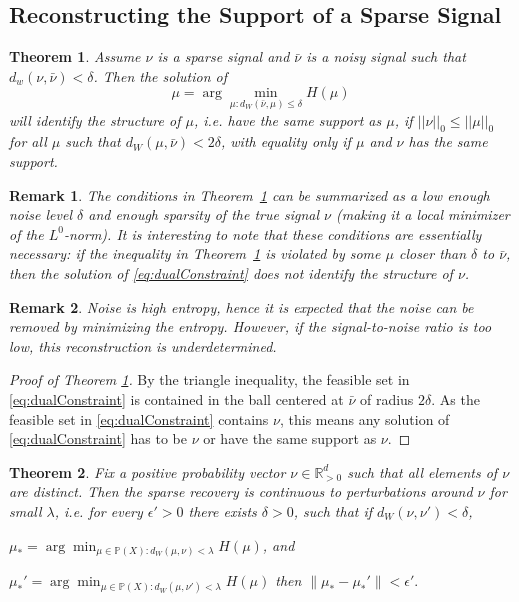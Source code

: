 \documentclass[conference]{IEEEtran}
\newcommand{\R}{{\mathbb{R}}}
\newcommand{\bbP}{{\mathbb{P}}}
\newtheorem{theorem}{Theorem}
\newtheorem*{remark}{Remark}
\begin{document}
\subsection{Reconstructing the Support of a Sparse Signal}
\begin{theorem}
    \label{thm1}
    Assume $\nu$ is a sparse signal and $\bar\nu$ is a noisy signal such that 
    $d_w(\nu,\bar\nu) < \delta $. Then the solution of 
    \begin{equation} \label{eq:dualConstraint} \mu=\arg\min_{\mu : d_W(\bar\nu,\mu) \le \delta} H(\mu) \end{equation} 
    will identify the structure of $\mu$, i.e. have the same support as $\mu$, if $||\nu||_0 \leq ||\mu||_0$ for all $\mu$ such that $d_W(\mu,\bar\nu)<2\delta$, with equality only if $\mu$ and $\nu$ has the same support.  
\end{theorem}

\begin{remark}
    The conditions in Theorem~\ref{thm1} can be summarized as a low enough noise level $\delta$ and enough sparsity of the true signal $\nu$ (making it a local minimizer of the $L^0$-norm). It is interesting to note that these conditions are essentially necessary: if the inequality in Theorem~\ref{thm1} is violated by some $\mu$ closer than $\delta$ to $\bar\nu$, then the solution of \eqref{eq:dualConstraint} does not identify the structure of $\nu$. 
\end{remark}

\begin{remark}
    Noise is high entropy, hence it is expected that the noise can be removed by minimizing the entropy. However, if the signal-to-noise ratio is too low, this reconstruction is underdetermined.
\end{remark}

\begin{proof}[Proof of Theorem \ref{thm1}]
    By the triangle inequality, the feasible set in \eqref{eq:dualConstraint} is contained in the ball centered at $\bar\nu$ of radius $2\delta$. As the feasible set in \eqref{eq:dualConstraint} contains $\nu$, this means any solution of \eqref{eq:dualConstraint} has to be $\nu$ or have the same support as $\nu$.
\end{proof}

\begin{theorem}
    Fix a positive probability vector $\nu\in\R^d_{>0}$ such that all elements of $\nu$ are distinct. 
    Then the sparse recovery is continuous to perturbations around $\nu$ for small $\lambda$, i.e. for every $\epsilon'>0$ there exists $\delta>0$, such that 
    if $d_W(\nu,\nu')<\delta$,
    
    $\mu_* = \arg\min_{\mu \in \bbP(X) : d_W(\mu, \nu)<\lambda} H(\mu)$,
    and 
    
    $\mu_*' = \arg\min_{\mu \in \bbP(X) : d_W(\mu, \nu')<\lambda} H(\mu)$
    then $\|\mu_*-\mu_*'\| < \epsilon'.$
    \label{thm:robust}
\end{theorem}
\end{document}
